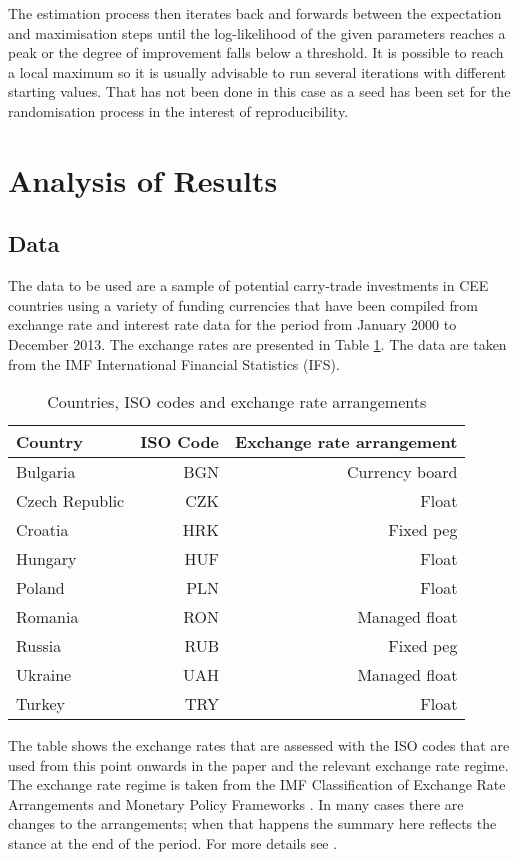 \documentclass[12pt, a4paper, oneside]{article}\usepackage[]{graphicx}\usepackage[]{color}
\begin{document}
The estimation process then iterates back and forwards between the expectation and maximisation steps until the log-likelihood of the given parameters reaches a peak or the degree of improvement falls below a threshold. It is possible to reach a local maximum so it is usually advisable to run several iterations with different starting values.  That has not been done in this case as a seed has been set for the randomisation process in the interest of reproducibility. 

\section{Analysis of Results}\label{secref:res}
\subsection{Data}
The data to be used are a sample of potential carry-trade investments in CEE countries using a variety of funding currencies that have been compiled from exchange rate and interest rate data for the period from January 2000 to December 2013. The exchange rates are presented in Table \ref{tabref:exrate}.  The data are taken from the IMF International Financial Statistics (IFS).  

\begin{table}[t]
\begin{threeparttable}
\centering
\begin{tabular}{p{5.7cm}rr}
  \hline
Country & ISO Code & Exchange rate arrangement\\
  \hline
Bulgaria & BGN & Currency board\\
Czech Republic & CZK & Float\\
Croatia & HRK & Fixed peg\\
Hungary & HUF & Float \\
Poland & PLN & Float\\
Romania & RON & Managed float\\
Russia & RUB & Fixed peg\\
Ukraine & UAH & Managed float\\
Turkey & TRY & Float\\
   \hline
\end{tabular}
\begin{tablenotes}
\small
\item The table shows the exchange rates that are assessed with the ISO codes that are used from this point onwards in the paper and the relevant exchange rate regime.  The exchange rate regime is taken from the IMF Classification of Exchange Rate Arrangements and Monetary Policy Frameworks \citet{IMFregime}. In many cases there are changes to the arrangements; when that happens the summary here reflects the stance at the end of the period.  For more details see \citet{Hayward2014}.  
\end{tablenotes}
\caption{Countries, ISO codes and exchange rate arrangements}
\label{tabref:exrate}
\end{threeparttable}
\end{table}
\end{document}
